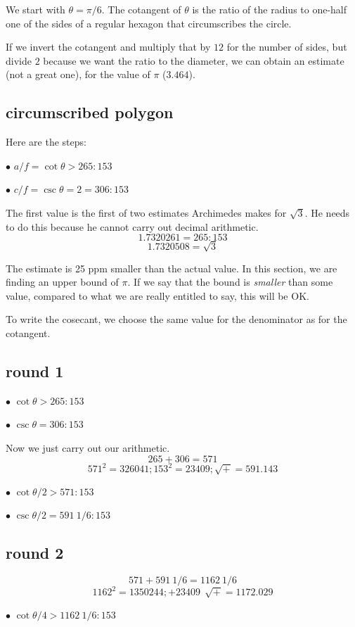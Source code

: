 \documentclass[11pt, oneside]{article}
\begin{document}
We start with $\theta = \pi/6$.  The cotangent of $\theta$ is the ratio of the radius to one-half one of the sides of a regular hexagon that circumscribes the circle.  

If we invert the cotangent and multiply that by $12$ for the number of sides, but divide $2$ because we want the ratio to the diameter, we can obtain an estimate (not a great one), for the value of $\pi$ ($3.464$).

\subsection*{circumscribed polygon}

Here are the steps:

$\bullet$  $a/f = \cot \theta > 265:153$

$\bullet$  $c/f = \csc \theta = 2 = 306:153$

The first value is the first of two estimates Archimedes makes for $\sqrt{3}$.  He needs to do this because he cannot carry out decimal arithmetic.
\[ 1.7320261 = 265:153 \]
\[ 1.7320508 = \sqrt{3} \]

The estimate is 25 ppm smaller than the actual value.  In this section, we are finding an upper bound of $\pi$.  If we say that the bound is \emph{smaller} than some value, compared to what we are really entitled to say, this will be OK.

To write the cosecant, we choose the same value for the denominator as for the cotangent.

\subsection*{round 1}

$\bullet$  $\cot \theta > 265:153$

$\bullet$  $\csc \theta =  306:153$

Now we just carry out our arithmetic. 
\[ 265 + 306 = 571 \]
\[ 571^2 = 326041;  153^2 = 23409;  \sqrt{+} = 591.143 \]

$\bullet$  $\cot \theta/2 > 571:153$

$\bullet$  $\csc \theta/2 =591 \ 1/6:153$

\subsection*{round 2}
\[ 571 + 591 \ 1/6 = 1162 \ 1/6 \]
\[ 1162^2 = 1350244;  + 23409 \ \ \sqrt{+} = 1172.029 \]

$\bullet$  $\cot \theta/4 > 1162 \ 1/6:153$ 
\end{document}
